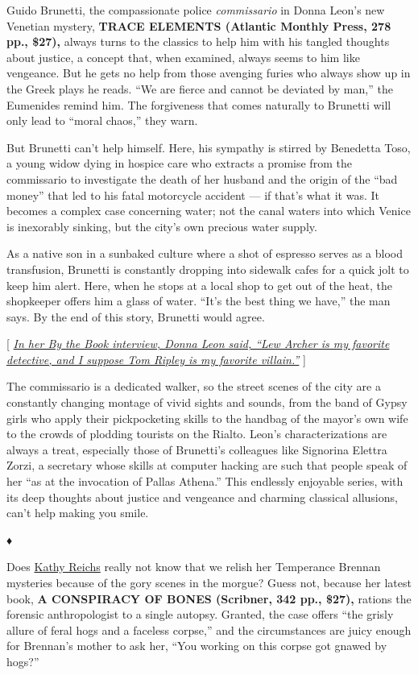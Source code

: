 Guido Brunetti, the compassionate police \emph{commissario} in Donna
Leon's new Venetian mystery, \textbf{TRACE ELEMENTS (Atlantic Monthly
Press, 278 pp., \$27),} always turns to the classics to help him with
his tangled thoughts about justice, a concept that, when examined,
always seems to him like vengeance. But he gets no help from those
avenging furies who always show up in the Greek plays he reads. ``We are
fierce and cannot be deviated by man,'' the Eumenides remind him. The
forgiveness that comes naturally to Brunetti will only lead to ``moral
chaos,'' they warn.

But Brunetti can't help himself. Here, his sympathy is stirred by
Benedetta Toso, a young widow dying in hospice care who extracts a
promise from the commissario to investigate the death of her husband and
the origin of the ``bad money'' that led to his fatal motorcycle
accident --- if that's what it was. It becomes a complex case concerning
water; not the canal waters into which Venice is inexorably sinking, but
the city's own precious water supply.

As a native son in a sunbaked culture where a shot of espresso serves as
a blood transfusion, Brunetti is constantly dropping into sidewalk cafes
for a quick jolt to keep him alert. Here, when he stops at a local shop
to get out of the heat, the shopkeeper offers him a glass of water.
``It's the best thing we have,'' the man says. By the end of this story,
Brunetti would agree.

{[}
\href{https://www.nytimes3xbfgragh.onion/2019/03/07/books/review/by-the-book-donna-leon.html}{\emph{In
her By the Book interview, Donna Leon said, ``Lew Archer is my favorite
detective, and I suppose Tom Ripley is my favorite villain.''}} {]}

The commissario is a dedicated walker, so the street scenes of the city
are a constantly changing montage of vivid sights and sounds, from the
band of Gypsy girls who apply their pickpocketing skills to the handbag
of the mayor's own wife to the crowds of plodding tourists on the
Rialto. Leon's characterizations are always a treat, especially those of
Brunetti's colleagues like Signorina Elettra Zorzi, a secretary whose
skills at computer hacking are such that people speak of her ``as at the
invocation of Pallas Athena.'' This endlessly enjoyable series, with its
deep thoughts about justice and vengeance and charming classical
allusions, can't help making you smile.

♦

Does
\href{https://www.nytimes3xbfgragh.onion/2013/09/15/books/review/inside-the-list.html}{Kathy
Reichs} really not know that we relish her Temperance Brennan mysteries
because of the gory scenes in the morgue? Guess not, because her latest
book, \textbf{A CONSPIRACY OF BONES (Scribner, 342 pp., \$27),} rations
the forensic anthropologist to a single autopsy. Granted, the case
offers ``the grisly allure of feral hogs and a faceless corpse,'' and
the circumstances are juicy enough for Brennan's mother to ask her,
``You working on this corpse got gnawed by hogs?''

